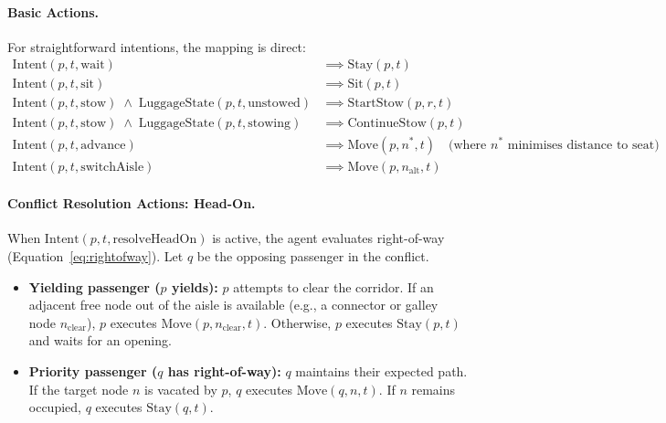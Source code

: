 \documentclass[11pt,a4paper]{article}
\begin{document}
\paragraph{Basic Actions.}
For straightforward intentions, the mapping is direct:
\begin{align*}
  \text{Intent}(p,t,\text{wait}) &\implies \text{Stay}(p,t) \\
  \text{Intent}(p,t,\text{sit}) &\implies \text{Sit}(p,t) \\
  \text{Intent}(p,t,\text{stow}) \;\wedge\; \text{LuggageState}(p,t,\text{unstowed}) &\implies \text{StartStow}(p,r,t) \\
  \text{Intent}(p,t,\text{stow}) \;\wedge\; \text{LuggageState}(p,t,\text{stowing}) &\implies \text{ContinueStow}(p,t) \\
  \text{Intent}(p,t,\text{advance}) &\implies \text{Move}(p,n^*,t) \quad \text{(where $n^*$ minimises distance to seat)} \\
  \text{Intent}(p,t,\text{switchAisle}) &\implies \text{Move}(p,n_{\text{alt}},t)
\end{align*}

\paragraph{Conflict Resolution Actions: Head-On.}
When $\text{Intent}(p,t,\text{resolveHeadOn})$ is active, the agent evaluates right-of-way (Equation~\ref{eq:rightofway}). Let $q$ be the opposing passenger in the conflict.
\begin{itemize}
    \item \textbf{Yielding passenger ($p$ yields):} $p$ attempts to clear the corridor. If an adjacent free node out of the aisle is available (e.g., a connector or galley node $n_{\text{clear}}$), $p$ executes $\text{Move}(p,n_{\text{clear}},t)$. Otherwise, $p$ executes $\text{Stay}(p,t)$ and waits for an opening.
    \item \textbf{Priority passenger ($q$ has right-of-way):} $q$ maintains their expected path. If the target node $n$ is vacated by $p$, $q$ executes $\text{Move}(q,n,t)$. If $n$ remains occupied, $q$ executes $\text{Stay}(q,t)$.
\end{itemize}
\end{document}
